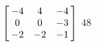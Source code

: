 {$\left[\hskip -3pt \begin{array}{ccc} -4&4&-4\\  0&0&-3
\\  -2&-2&-1\end{array}\hskip -3pt \right] $} 
{$48$}



  

